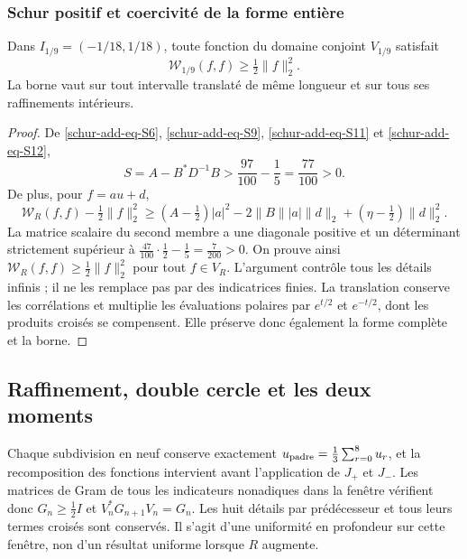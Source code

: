 \subsubsection{Schur positif et coercivité de la forme entière}
\label{schur-add-sub-348}

\begin{theorem}
\label{schur-add:coercividad-ventana}
Dans \(I_{1/9}=(-1/18,1/18)\), toute fonction du domaine conjoint
\(V_{1/9}\) satisfait
\[
\mathscr W_{1/9}(f,f)\geq\tfrac12\|f\|_2^2.
\]
La borne vaut sur tout intervalle translaté de même longueur et sur tous
ses raffinements intérieurs.
\end{theorem}
\begin{proof}
De \eqref{schur-add-eq-S6}, \eqref{schur-add-eq-S9}, \eqref{schur-add-eq-S11} et \eqref{schur-add-eq-S12},
\begin{equation}
S=A-B^*D^{-1}B>\frac{97}{100}-\frac15=\frac{77}{100}>0.
\label{schur-add-display-29}
\end{equation}
De plus, pour \(f=au+d\),
\begin{equation}
\mathscr W_R(f,f)-\tfrac12\|f\|_2^2
\geq(A-\tfrac12)|a|^2
-2\|B\||a|\|d\|_2+(\eta-\tfrac12)\|d\|_2^2.
\label{schur-add-display-30}
\end{equation}
La matrice scalaire du second membre a une diagonale positive et un déterminant strictement supérieur à \(\tfrac{47}{100}\cdot\tfrac12-\tfrac15=\tfrac7{200}>0\). On prouve ainsi \(\mathscr W_R(f,f)\geq\tfrac12\|f\|_2^2\) pour tout \(f\in V_R\). L'argument contrôle tous les détails infinis ; il ne les remplace pas par des indicatrices finies. La translation conserve les corrélations et multiplie les évaluations polaires par \(e^{t/2}\) et \(e^{-t/2}\), dont les produits croisés se compensent. Elle préserve donc également la forme complète et la borne.
\end{proof}

\subsection{Raffinement, double cercle et les deux moments}
\label{schur-add-sub-367}

Chaque subdivision en neuf conserve exactement \(u_{\rm padre}=\tfrac13\sum_{r=0}^8u_r\), et la recomposition des fonctions intervient avant l'application de \(J_+\) et \(J_-\). Les matrices de Gram de tous les indicateurs nonadiques dans la fenêtre vérifient donc \(G_n\geq\tfrac12 I\) et \(V_n^*G_{n+1}V_n=G_n\). Les huit détails par prédécesseur et tous leurs termes croisés sont conservés. Il s'agit d'une uniformité en profondeur sur cette fenêtre, non d'un résultat uniforme lorsque \(R\) augmente.

